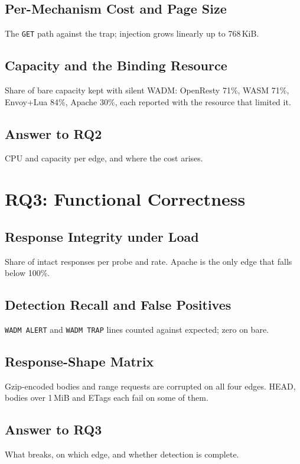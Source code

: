 \documentclass{rptuma}
\begin{document}
\section{Per-Mechanism Cost and Page Size}
The \texttt{GET} path against the trap; injection grows linearly up to 768\,KiB.
\section{Capacity and the Binding Resource}
Share of bare capacity kept with silent WADM: OpenResty 71\%, WASM 71\%, Envoy+Lua 84\%, Apache
30\%, each reported with the resource that limited it.
\section{Answer to RQ2}
CPU and capacity per edge, and where the cost arises.

\chapter{RQ3: Functional Correctness}
\section{Response Integrity under Load}
Share of intact responses per probe and rate. Apache is the only edge that falls below 100\%.
\section{Detection Recall and False Positives}
\texttt{WADM ALERT} and \texttt{WADM TRAP} lines counted against expected; zero on bare.
\section{Response-Shape Matrix}
Gzip-encoded bodies and range requests are corrupted on all four edges. HEAD, bodies over 1\,MiB
and ETags each fail on some of them.
\section{Answer to RQ3}
What breaks, on which edge, and whether detection is complete.
\end{document}
